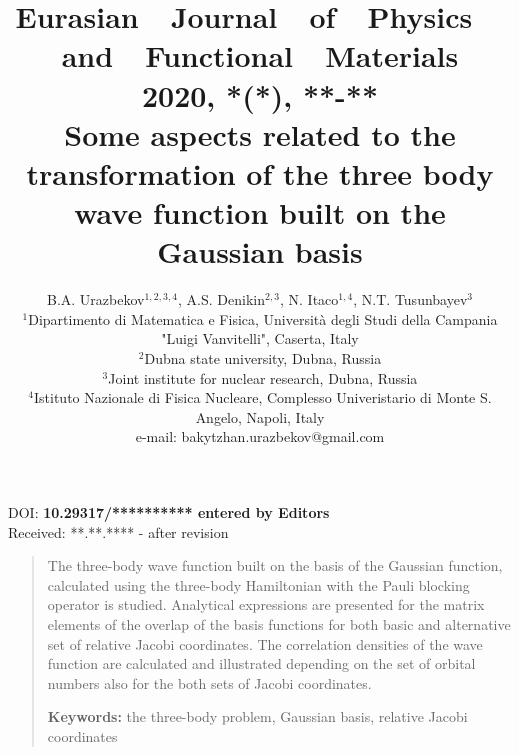 \documentclass[12pt,a4paper,twoside]{article}
\begin{document}

\newenvironment{sciabstract}{
\begin{quote} \scriptsize}
{\end{quote}}

\pretitle{\begin{center}\Huge\bfseries} %

\title{{\normalsize{Eurasian~~Journal~~of~~Physics~~and~~Functional~~Materials\\ 
2020, \textbf{*}(*),   **-**}} \\[2.0cm]%
Some aspects related to the transformation of the three body wave function built on the Gaussian basis}%

\author
{B.A. Urazbekov$^{1,2,3,4}$, A.S. Denikin$^{2,3}$, N. Itaco$^{1,4}$, N.T. Tusunbayev$^3$\\ 
\scriptsize{$^1$Dipartimento di Matematica e Fisica, Universit\`a degli Studi della Campania "Luigi Vanvitelli", Caserta, Italy }\\
\scriptsize{$^2$Dubna state university, Dubna, Russia}\\
\scriptsize{$^3$Joint institute for nuclear research, Dubna, Russia}\\
\scriptsize{$^4$Istituto Nazionale di Fisica Nucleare, Complesso Univeristario di Monte S. Angelo, Napoli, Italy}\\
\scriptsize{e-mail: bakytzhan.urazbekov@gmail.com}\\%
}

\date{}%
\maketitle

\begin{flushleft}
\scriptsize{ DOI: \textbf{ 10.29317/********** entered by Editors}\\
Received: **.**.**** - after revision}

\end{flushleft} 

\begin{sciabstract}%

The three-body wave function built on the basis of the Gaussian function, calculated using the three-body Hamiltonian with the Pauli blocking operator is studied. Analytical expressions are presented for the matrix elements of the overlap of the basis functions for both basic and alternative set of relative Jacobi coordinates. The correlation densities of the wave function are calculated and illustrated depending on the set of orbital numbers also for the both sets of Jacobi coordinates.


{\textbf{Keywords:} the three-body problem, Gaussian basis, relative Jacobi coordinates}

\end{sciabstract}
\end{document}
